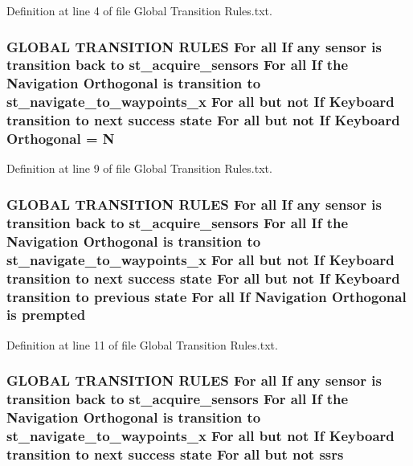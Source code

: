 Definition at line 4 of file Global Transition Rules.\+txt.

\subsubsection[{\texorpdfstring{Orthogonal}{Orthogonal}}]{\setlength{\rightskip}{0pt plus 5cm}G\+L\+O\+B\+AL T\+R\+A\+N\+S\+I\+T\+I\+ON R\+U\+L\+ES For all If any sensor is transition back to st\+\_\+acquire\+\_\+sensors For all If the Navigation Orthogonal is transition to st\+\_\+navigate\+\_\+to\+\_\+waypoints\+\_\+x For all but not If Keyboard transition to next success state For all but not If Keyboard Orthogonal = N}\hypertarget{docs_2Global_01Transition_01Rules_8txt_a2e1cdec29dad5013e514270d0a78fe22}{}\label{docs_2Global_01Transition_01Rules_8txt_a2e1cdec29dad5013e514270d0a78fe22}


Definition at line 9 of file Global Transition Rules.\+txt.

\subsubsection[{\texorpdfstring{prempted}{prempted}}]{\setlength{\rightskip}{0pt plus 5cm}G\+L\+O\+B\+AL T\+R\+A\+N\+S\+I\+T\+I\+ON R\+U\+L\+ES For all If any sensor is transition back to st\+\_\+acquire\+\_\+sensors For all If the Navigation {\bf Orthogonal} is transition to st\+\_\+navigate\+\_\+to\+\_\+waypoints\+\_\+x For all but not If Keyboard transition to next success state For all but not If Keyboard transition to previous state For all If Navigation {\bf Orthogonal} is prempted}\hypertarget{docs_2Global_01Transition_01Rules_8txt_ac6583c64beac40f27e253c605d5d5b5b}{}\label{docs_2Global_01Transition_01Rules_8txt_ac6583c64beac40f27e253c605d5d5b5b}


Definition at line 11 of file Global Transition Rules.\+txt.

\subsubsection[{\texorpdfstring{ssrs}{ssrs}}]{\setlength{\rightskip}{0pt plus 5cm}G\+L\+O\+B\+AL T\+R\+A\+N\+S\+I\+T\+I\+ON R\+U\+L\+ES For all If any sensor is transition back to st\+\_\+acquire\+\_\+sensors For all If the Navigation {\bf Orthogonal} is transition to st\+\_\+navigate\+\_\+to\+\_\+waypoints\+\_\+x For all but not If Keyboard transition to next success state For all but not ssrs}\hypertarget{docs_2Global_01Transition_01Rules_8txt_aa881c6a22397113c3342bf4c44212934}{}\label{docs_2Global_01Transition_01Rules_8txt_aa881c6a22397113c3342bf4c44212934}


